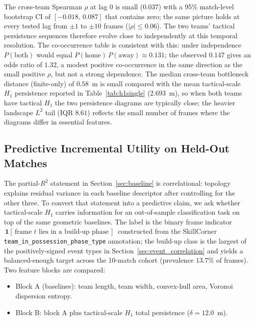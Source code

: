 The cross-team Spearman \(\rho\) at lag 0 is small (\(0.037\)) with a 95\% match-level bootstrap CI of \([-0.018,\,0.087]\) that contains zero; the same picture holds at every tested lag from \(\pm 1\) to \(\pm 10\) frames (\(|\rho|\leq 0.06\)). The two teams' tactical persistence sequences therefore evolve close to independently at this temporal resolution. The co-occurrence table is consistent with this: under independence \(P(\text{both})\) would equal \(P(\text{home})\,P(\text{away})\approx 0.131\); the observed \(0.147\) gives an odds ratio of \(1.32\), a modest positive co-occurrence in the same direction as the small positive \(\rho\), but not a strong dependence. The median cross-team bottleneck distance (finite-only) of \(0.58\)~m is small compared with the mean tactical-scale \(H_1\) persistence reported in Table~\ref{tab:h1single} (\(2.693\)~m), so when both teams have tactical \(H_1\) the two persistence diagrams are typically close; the heavier landscape \(L^2\) tail (IQR \(8.61\)) reflects the small number of frames where the diagrams differ in essential features.

\subsection{Predictive Incremental Utility on Held-Out Matches}
\label{sec:predictive}

The partial-\(R^2\) statement in Section~\ref{sec:baseline} is correlational: topology explains residual variance in each baseline descriptor after controlling for the other three. To convert that statement into a predictive claim, we ask whether tactical-scale $H_1$ carries information for an out-of-sample classification task on top of the same geometric baselines. The label is the binary frame indicator
\(\,\mathbf{1}[\,\text{frame }t\text{ lies in a build-up phase}\,]\,\)
constructed from the SkillCorner \\
\texttt{team\_in\_possession\_phase\_type} 
annotation; the build-up class is the largest of the positively-signed event types in Section~\ref{sec:event_correlation} and yields a balanced-enough target across the 10-match cohort (prevalence \(13.7\%\) of frames). Two feature blocks are compared:

\begin{itemize}
  \item Block A (baselines): team length, team width, convex-hull area, Voronoi dispersion entropy.
  \item Block B: block A plus tactical-scale \(H_1\) total persistence (\(\delta=12.0\)~m).
\end{itemize}

